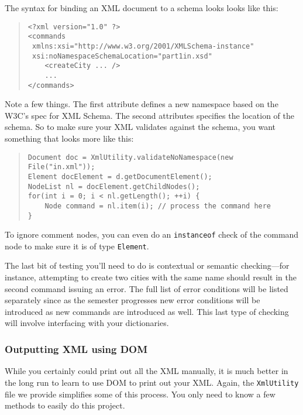 \documentclass[12pt]{article}
\begin{document}
The syntax for binding an XML document to a schema looks looks like this:

\begin{quote}
\begin{verbatim}
<?xml version="1.0" ?>
<commands
 xmlns:xsi="http://www.w3.org/2001/XMLSchema-instance"
 xsi:noNamespaceSchemaLocation="part1in.xsd"
    <createCity ... />
    ...
</commands>
\end{verbatim}
\end{quote}

Note a few things. The first attribute defines a new namespace based on the W3C's spec for XML Schema. 
The second attributes specifies the location of the schema. So to make sure your XML validates against 
the schema, you want something that looks more like this:

\begin{quote}
\begin{verbatim}
Document doc = XmlUtility.validateNoNamespace(new File("in.xml"));
Element docElement = d.getDocumentElement();
NodeList nl = docElement.getChildNodes();
for(int i = 0; i < nl.getLength(); ++i) {
    Node command = nl.item(i); // process the command here
}
\end{verbatim}
\end{quote}

To ignore comment nodes, you can even do an \texttt{instanceof} check of the command node to make sure it is of type \texttt{Element}.

The last bit of testing you'll need to do is contextual or semantic
checking---for instance, attempting to create two cities with the same
name should result in the second command issuing an error.  The full
list of error conditions will be listed separately since as the
semester progresses new error conditions will be introduced as new
commands are introduced as well.  This last type of checking will
involve interfacing with your dictionaries.

\subsubsection{ Outputting XML using DOM}

While you certainly could print out all the XML manually, it is much better in the long run to learn to use DOM to print out your XML. Again, the \texttt{XmlUtility} file we provide simplifies some of this process. You only need to know a few methods to easily do this project.
\end{document}
